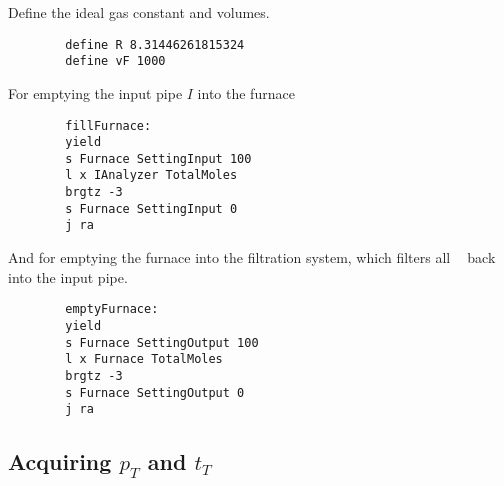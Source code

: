 \documentclass{article}
\DeclareMathOperator{\CDiox}{\mathrm{CO}_2}
\begin{document}
\begin{paracol}{2}
    Define the ideal gas constant and volumes.
    \begin{verbatim}
        define R 8.31446261815324
        define vF 1000
    \end{verbatim}
    \switchcolumn
    \switchcolumn*
    \noindent
    For emptying the input pipe $I$ into the furnace
    \switchcolumn
    \begin{verbatim}
        fillFurnace:
        yield
        s Furnace SettingInput 100
        l x IAnalyzer TotalMoles
        brgtz -3
        s Furnace SettingInput 0
        j ra
    \end{verbatim}
    \switchcolumn*
    \noindent
    And for emptying the furnace into the filtration system,
    which filters all $\CDiox$ back into the input pipe.
    \switchcolumn
    \vspace{-1em}
    \begin{verbatim}
        emptyFurnace:
        yield
        s Furnace SettingOutput 100
        l x Furnace TotalMoles
        brgtz -3
        s Furnace SettingOutput 0
        j ra
    \end{verbatim}
\end{paracol}

\subsection{Acquiring $p_T$ and $t_T$}
\end{document}
